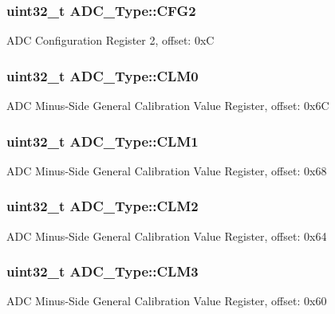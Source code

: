 \subsubsection[{\texorpdfstring{C\+F\+G2}{CFG2}}]{ uint32\+\_\+t A\+D\+C\+\_\+\+Type\+::\+C\+F\+G2}\hypertarget{structADC__Type_a089c1cc67b67d8cc7ac213a28d317bf8}{}\label{structADC__Type_a089c1cc67b67d8cc7ac213a28d317bf8}
A\+DC Configuration Register 2, offset\+: 0xC 
\subsubsection[{\texorpdfstring{C\+L\+M0}{CLM0}}]{ uint32\+\_\+t A\+D\+C\+\_\+\+Type\+::\+C\+L\+M0}\hypertarget{structADC__Type_a8700ba0357efc8ee2066ff4906a196b2}{}\label{structADC__Type_a8700ba0357efc8ee2066ff4906a196b2}
A\+DC Minus-\/\+Side General Calibration Value Register, offset\+: 0x6C 
\subsubsection[{\texorpdfstring{C\+L\+M1}{CLM1}}]{ uint32\+\_\+t A\+D\+C\+\_\+\+Type\+::\+C\+L\+M1}\hypertarget{structADC__Type_a87b7c165ef9dc4d4b5db9a15ff39b3f1}{}\label{structADC__Type_a87b7c165ef9dc4d4b5db9a15ff39b3f1}
A\+DC Minus-\/\+Side General Calibration Value Register, offset\+: 0x68 
\subsubsection[{\texorpdfstring{C\+L\+M2}{CLM2}}]{ uint32\+\_\+t A\+D\+C\+\_\+\+Type\+::\+C\+L\+M2}\hypertarget{structADC__Type_a2c52931453e9fab0bd1fa24a5e771a8c}{}\label{structADC__Type_a2c52931453e9fab0bd1fa24a5e771a8c}
A\+DC Minus-\/\+Side General Calibration Value Register, offset\+: 0x64 
\subsubsection[{\texorpdfstring{C\+L\+M3}{CLM3}}]{ uint32\+\_\+t A\+D\+C\+\_\+\+Type\+::\+C\+L\+M3}\hypertarget{structADC__Type_a8c1d865925f38226c6c93f502abfc32d}{}\label{structADC__Type_a8c1d865925f38226c6c93f502abfc32d}
A\+DC Minus-\/\+Side General Calibration Value Register, offset\+: 0x60 
